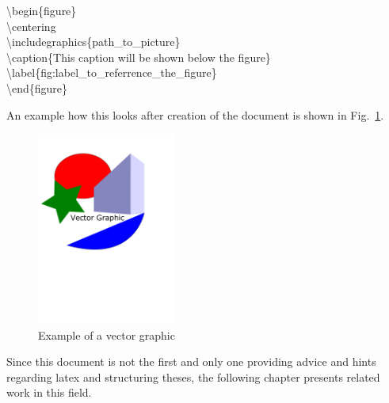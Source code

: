 \begin{flushleft}

\textbackslash begin\{figure\} \\
	\textbackslash centering \\
		\textbackslash includegraphics\{path\_to\_picture\} \\
	\textbackslash caption\{This caption will be shown below the figure\} \\
	\textbackslash label\{fig:label\_to\_referrence\_the\_figure\} \\
\textbackslash end\{figure\} \\

\end{flushleft}


An example how this looks after creation of the document is shown in Fig.~\ref{fig:logo}.
\begin{figure}[H]
	\centering
		\includegraphics[width=0.40\textwidth]{figures/vectorGraphic.pdf}
	\caption{Example of a vector graphic}
	\label{fig:logo}
\end{figure}

Since this document is not the first and only one providing advice and hints regarding latex and structuring theses, the following chapter presents related work in this field.